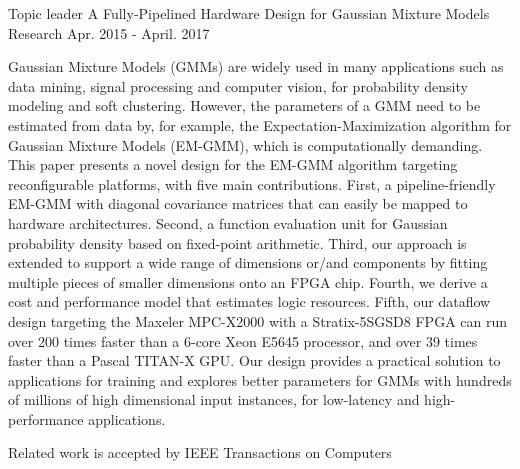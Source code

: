 \documentclass[11pt, a4paper]{awesome-cv}
\begin{document}
\begin{cventries}
  \cventry
    {Topic leader} %
    {A Fully-Pipelined Hardware Design for Gaussian Mixture Models} %
    {Research} %
    {Apr. 2015 - April. 2017} %
    {
      \begin{cvitems} %
        \item {Gaussian Mixture Models (GMMs) are widely used in many applications such as data mining, signal processing and computer vision, for probability density modeling and soft clustering. However, the parameters of a GMM need to be estimated from data by, for example, the Expectation-Maximization algorithm for Gaussian Mixture Models (EM-GMM), which is computationally demanding. This paper presents a novel design for the EM-GMM algorithm targeting reconfigurable platforms, with five main contributions.  First, a pipeline-friendly EM-GMM with diagonal covariance matrices that can easily be mapped to hardware architectures. Second, a function evaluation unit for Gaussian probability density based on fixed-point arithmetic. Third, our approach is extended to support a wide range of dimensions or/and components by fitting multiple pieces of smaller dimensions onto an FPGA chip. Fourth, we derive a cost and performance model that estimates logic resources. Fifth, our dataflow design targeting the Maxeler MPC-X2000 with a Stratix-5SGSD8 FPGA can run over 200 times faster than a 6-core Xeon E5645 processor, and over 39 times faster than a Pascal TITAN-X GPU.  Our design provides a practical solution to applications for training and explores better parameters for GMMs with hundreds of millions of high dimensional input instances, for low-latency and high-performance applications.}
        \item {Related work is accepted by IEEE Transactions on Computers}
      \end{cvitems}
    }



\end{cventries}
\end{document}

